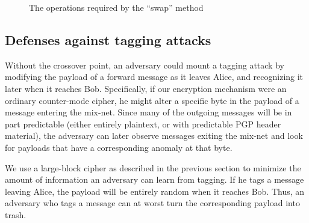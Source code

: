 \documentclass[11pt]{IEEEtran}
\begin{document}
\begin{figure}
\begin{center}
\caption{The operations required by the ``swap'' method} 
\end{center}
\end{figure}


\subsection{Defenses against tagging attacks}
\label{subsec:tagging-defenses}

Without the crossover point, an adversary could mount a tagging
attack by modifying the payload of a forward message as
it leaves Alice, and recognizing it later when it reaches Bob.
Specifically, if our encryption mechanism were an ordinary
counter-mode cipher, he might alter a specific byte in the payload of
a message entering the mix-net. Since many of the outgoing messages
will be in part predictable (either entirely plaintext, or with
predictable PGP header material), the adversary can later observe
messages exiting the mix-net and look for payloads that have a
corresponding anomaly at that byte.


We use a large-block cipher as described in the previous section to
minimize the amount of information an adversary can learn from tagging.
If he tags a message
leaving Alice, the payload will be entirely random when it reaches
Bob.  Thus, an adversary who tags a message can at worst turn the
corresponding payload into trash.  
\end{document}
